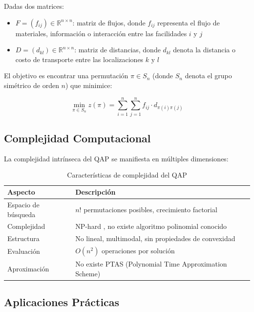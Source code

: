 \documentclass[12pt, a4paper]{article}
\begin{document}
Dadas dos matrices:
\begin{itemize}
    \item $F = (f_{ij}) \in \mathbb{R}^{n \times n}$: matriz de flujos, donde $f_{ij}$ representa el flujo de materiales, información o interacción entre las facilidades $i$ y $j$
    \item $D = (d_{kl}) \in \mathbb{R}^{n \times n}$: matriz de distancias, donde $d_{kl}$ denota la distancia o costo de transporte entre las localizaciones $k$ y $l$
\end{itemize}

El objetivo es encontrar una permutación $\pi \in S_n$ (donde $S_n$ denota el grupo simétrico de orden $n$) que minimice:

\begin{equation}
\min_{\pi \in S_n} z(\pi) = \sum_{i=1}^{n} \sum_{j=1}^{n} f_{ij} \cdot d_{\pi(i)\pi(j)}
\label{eq:qap}
\end{equation}

\subsection{Complejidad Computacional}

La complejidad intrínseca del QAP se manifiesta en múltiples dimensiones:

\begin{table}[H]
\centering
\caption{Características de complejidad del QAP}
\begin{tabular}{@{}lp{8cm}@{}}
\toprule
\textbf{Aspecto} & \textbf{Descripción} \\
\midrule
Espacio de búsqueda & $n!$ permutaciones posibles, crecimiento factorial \\
Complejidad & NP-hard \cite{sahni1976}, no existe algoritmo polinomial conocido \\
Estructura & No lineal, multimodal, sin propiedades de convexidad \\
Evaluación & $O(n^2)$ operaciones por solución \\
Aproximación & No existe PTAS (Polynomial Time Approximation Scheme) \cite{arora1998} \\
\bottomrule
\end{tabular}
\end{table}

\subsection{Aplicaciones Prácticas}
\end{document}
